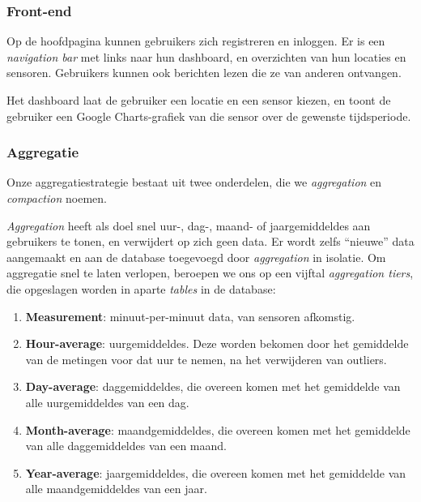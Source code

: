 \documentclass[12pt,draft,parskip=full]{article}
\begin{document}
\subsubsection{Front-end}
Op de hoofdpagina kunnen gebruikers zich registreren en inloggen. Er is een
\textit{navigation bar} met links naar hun dashboard, en overzichten van hun locaties en sensoren. Gebruikers kunnen ook berichten lezen die ze van anderen ontvangen.

Het dashboard laat de gebruiker een locatie en een sensor kiezen, en toont de gebruiker een Google Charts-grafiek van die sensor over de gewenste
tijdsperiode.

\subsubsection{Aggregatie}

Onze aggregatiestrategie bestaat uit twee onderdelen, die we \emph{aggregation} en \emph{compaction} noemen.

\emph{Aggregation} heeft als doel snel uur-, dag-, maand- of jaargemiddeldes aan gebruikers te tonen, en verwijdert op zich geen data. Er wordt zelfs ``nieuwe'' data aangemaakt en aan de database toegevoegd door \emph{aggregation} in isolatie. Om aggregatie snel te laten verlopen, beroepen we ons op een vijftal \emph{aggregation tiers}, die opgeslagen worden in aparte \emph{tables} in de database:

\begin{enumerate}
	\item \textbf{Measurement}: minuut-per-minuut data, van sensoren afkomstig.

	\item \textbf{Hour-average}: uurgemiddeldes. Deze worden bekomen door het gemiddelde van de metingen voor dat uur te nemen, na het verwijderen van outliers.

	\item \textbf{Day-average}: daggemiddeldes, die overeen komen met het gemiddelde van alle uurgemiddeldes van een dag.

	\item \textbf{Month-average}: maandgemiddeldes, die overeen komen met het gemiddelde van alle daggemiddeldes van een maand.

	\item \textbf{Year-average}: jaargemiddeldes, die overeen komen met het gemiddelde van alle maandgemiddeldes van een jaar.
\end{enumerate}
\end{document}
